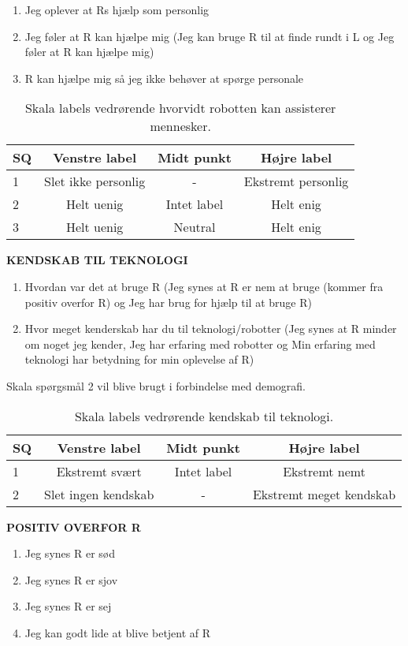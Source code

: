 %
\begin{enumerate}
  \item Jeg oplever at Rs hjælp som personlig
  \item Jeg føler at R kan hjælpe mig (Jeg kan bruge R til at finde rundt i L og Jeg føler at R kan hjælpe mig)
  \item R kan hjælpe mig så jeg ikke behøver at spørge personale
\end{enumerate}
%
\begin{table}[H]
	\centering
	\begin{tabular}{l|c|c|c}
		SQ     & Venstre label & Midt punkt & Højre label \\\hline
		1   & Slet ikke personlig & - & Ekstremt personlig          \\\hline
		2   & Helt uenig & Intet label & Helt enig   \\\hline
		3   & Helt uenig & Neutral & Helt enig  \\\hline
	\end{tabular}
\caption{Skala labels vedrørende hvorvidt robotten kan assisterer mennesker.}
	\label{tab:AssistererMennesker}
\end{table}
\noindent
%
\textbf{KENDSKAB TIL TEKNOLOGI}\\
%
\begin{enumerate}
  \item Hvordan var det at bruge R (Jeg synes at R er nem at bruge (kommer fra positiv overfor R) og Jeg har brug for hjælp til at bruge R)
  \item Hvor meget kenderskab har du til teknologi/robotter (Jeg synes at R minder om noget jeg kender, Jeg har erfaring med robotter og Min erfaring med teknologi har betydning for min oplevelse af R)
\end{enumerate}
%
Skala spørgsmål 2 vil blive brugt i forbindelse med demografi.
%
\begin{table}[H]
	\centering 
	\begin{tabular}{l|c|c|c}
		SQ     & Venstre label & Midt punkt & Højre label \\\hline
		1   & Ekstremt svært & Intet label & Ekstremt nemt          \\\hline
		2   & Slet ingen kendskab & - & Ekstremt meget kendskab 
	\end{tabular}
\caption{Skala labels vedrørende kendskab til teknologi.}
	\label{tab:KendskabTilTek}
\end{table}
\noindent
%
\textbf{POSITIV OVERFOR R}\\
%
\begin{enumerate}
  \item Jeg synes R er sød
  \item Jeg synes R er sjov
  \item Jeg synes R er sej
  \item Jeg kan godt lide at blive betjent af R
\end{enumerate}
